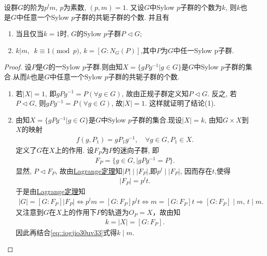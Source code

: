 \documentclass[../../main.tex]{subfiles}%
\begin{document}
\begin{theorem}[Sylow第三定理]\label{theorem:Sylow第三定理}
设群$G$的阶为$p^lm$, $p$为素数, $(p,m)=1$. 又设$G$中Sylow $p$子群的个数为$k$, 则$k$也是$G$中任意一个Sylow $p$子群的共轭子群的个数.
并且有
\begin{enumerate}[(1)]
\item\label{theorem:Sylow第三定理-1} 当且仅当$k=1$时, $G$的Sylow $p$子群$P\lhd G$;

\item\label{theorem:Sylow第三定理-2} $k|m$, $\,\,k\equiv 1\pmod{p}$,$\,\,k=[G:N_G(P)]$,其中$P$为$G$中任一Sylow p子群.
\end{enumerate}
\end{theorem}
\begin{proof}

设$P$是$G$的一Sylow $p$子群.则由知$X=\{gPg^{-1}|g\in G\}$是$G$中Sylow $p$子群的集合.从而$k$也是$G$中任意一个Sylow $p$子群的共轭子群的个数.
\begin{enumerate}[(1)]
\item 若$|X|=1$, 即$gPg^{-1}=P(\forall g\in G)$, 故由正规子群定义知$P\lhd G$. 反之, 若$P\lhd G$, 则$gPg^{-1}=P(\forall g\in G)$, 故$|X|=1$. 这样就证明了结论(1).

\item 由知$X=\{gPg^{-1}|g\in G\}$是$G$中Sylow $p$子群的集合.现设$|X|=k$, 由知$G\times X$到$X$的映射
\begin{align*}
f(g,P_1)=gP_1g^{-1}, \quad \forall g\in G, P_1\in X.
\end{align*}
定义了$G$在$X$上的作用. 设$F_P$为$P$的迷向子群, 即
\begin{align*}
F_P=\{g\in G, |gPg^{-1}=P\}.
\end{align*}
显然, $P\lhd F_P$, 故由\hyperref[theorem:抽象代数--Lagrange定理]{Lagrange定理}知$|P|\mid |F_P|$,即$p^l\mid |F_P|$, 因而存在$t$,使得
\begin{align}\label{eq::90j243gy5yhserfgdjirzz}
|F_P|=p^lt.
\end{align}
于是由\hyperref[theorem:抽象代数--Lagrange定理]{Lagrange定理}知
\begin{align}\label{eq::iogjio30uv33}
|G|=[G:F_P]|F_P| \iff p^lm=[G:F_P]p^lt \iff m=[G:F_P]t\Longrightarrow [G:F_P] \mid m,\, t\mid m.
\end{align}
又注意到$G$在$X$上的作用下$P$的轨道为$O_P=X$，故由知
\begin{align*}
k=|X|=[G:F_P].
\end{align*}
因此再结合\eqref{eq::iogjio30uv33}式得$k\mid m$.


\end{enumerate}
\end{proof}
\end{document}
